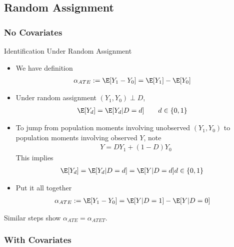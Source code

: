 \documentclass[aspectratio=169, handout]{beamer}
\begin{document}
\subsection{Random Assignment}

\subsubsection{No Covariates}

{\scriptsize
\begin{frame}{Identification Under Random Assignment}
\begin{itemize}
  \item We have definition
    \begin{align*}
      \alpha_{ATE}
      &:=
      \E[Y_1-Y_0]
      =\E[Y_1]-\E[Y_0]
    \end{align*}
  \pause
  \item Under random assignment $(Y_1,Y_0)\perp D$,
    \begin{align*}
      \E[Y_d]
      &=
      \E[Y_d|D=d]
      \qquad
      d\in\{0,1\}
    \end{align*}

  \pause
  \item To jump from population moments involving
    \alert{unobserved} $(Y_1,Y_0)$ to population
    moments involving \alert{observed} $Y$, note
    \begin{align*}
      Y = DY_1 + (1-D)Y_0
    \end{align*}
    This implies
    \begin{align*}
      \E[Y_d]
      &=
      \E[Y_d|D=d]
      =
      \E[Y|D=d]
      d\in\{0,1\}
    \end{align*}

  \pause
  \item
    Put it all together
    \begin{align*}
      \alpha_{ATE}
      &:=
      \E[Y_1-Y_0]
      =
      \E[Y|D=1]
      -
      \E[Y|D=0]
    \end{align*}
\end{itemize}
Similar steps show $\alpha_{ATE}=\alpha_{ATET}$.
\end{frame}
}

\subsubsection{With Covariates}
\end{document}
